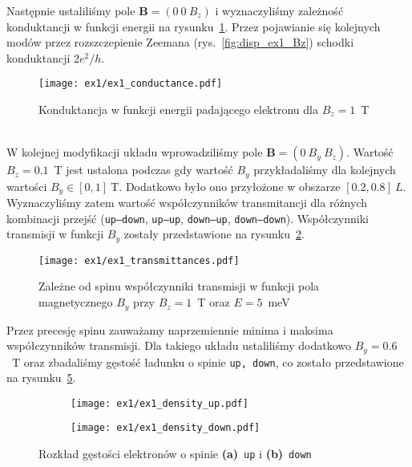 \documentclass{article}
\begin{document}
Następnie ustaliliśmy pole $\mathbf{B} = (0 \ 0 \ B_z)$ i wyznaczyliśmy zależność konduktancji w funkcji energii na rysunku~\ref{fig:conductance_ex1}.
Przez pojawianie się kolejnych modów przez rozszczepienie Zeemana (rys.~\ref{fig:disp_ex1_Bz}) schodki konduktancji $2e^2/h$.\\
\begin{figure}[htp!]
    \centering
    \texttt{[image: ex1/ex1\_conductance.pdf]}
    \caption{Konduktancja w funkcji energii padającego elektronu dla $B_z = 1$~T}
    \label{fig:conductance_ex1}
\end{figure}
\\
W kolejnej modyfikacji układu wprowadziliśmy pole $\mathbf{B} = (0 \ B_y \ B_z)$.
Wartość $B_z=0.1$~T jest ustalona podczas gdy wartość $B_y$ przykładaliśmy dla kolejnych wartości $B_y\in[0,1]~$T.
Dodatkowo było ono przyłożone w obszarze $[0.2, 0.8]~L$.
Wyznaczyliśmy zatem wartość współczynników transmitancji dla różnych kombinacji przejść (\texttt{up--down}, \texttt{up--up}, \texttt{down--up}, \texttt{down--down}).
Współczynniki transmisji w funkcji $B_y$ zostały przedstawione na rysunku~\ref{fig:ex1_trans_spin}.
\begin{figure}[htp!]
    \centering
    \texttt{[image: ex1/ex1\_transmittances.pdf]}
    \caption{Zależne od spinu współczynniki transmisji w funkcji pola magnetycznego $B_y$ przy $B_z = 1$~T oraz $E = 5$~meV}
    \label{fig:ex1_trans_spin}
\end{figure}
Przez precesję spinu zauważamy naprzemiennie minima i maksima współczynników transmisji.
Dla takiego układu ustaliliśmy dodatkowo $B_y=0.6$~T oraz zbadaliśmy gęstość ładunku o spinie \texttt{up, down}, co zostało przedstawione na rysunku~\ref{fig:ex1-spin-density}.
\begin{figure}[htp!]
    \centering
\begin{subfigure}{.32\textwidth}
    \centering
    \texttt{[image: ex1/ex1\_density\_up.pdf]}
    \caption{}
    \label{fig:ex1-spin-up}
\end{subfigure}
\begin{subfigure}{.32\textwidth}
    \centering
    \texttt{[image: ex1/ex1\_density\_down.pdf]}
    \caption{}
    \label{fig:ex1-spin-down}
\end{subfigure}
\caption{Rozkład gęstości elektronów o spinie \textbf{(a)}~\texttt{up} i \textbf{(b)}~\texttt{down} }
\label{fig:ex1-spin-density}
\end{figure}
\end{document}
